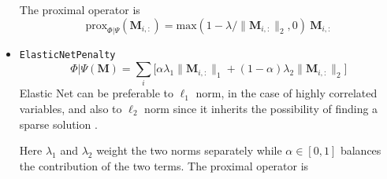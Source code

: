 \begin{itemize}
The proximal operator is
\begin{equation}\label{proxl2}
\text{prox}_{\Phi|\Psi}(\mathbf{M}_{i,:}) = \text{max}(1 - \lambda/ \| \mathbf{M}_{i,:}\|_2, 0)\ \mathbf{M}_{i,:}
\end{equation}
%
%
%
\item \texttt{ElasticNetPenalty}
\begin{equation}\label{l1l2penalty}
\Phi|\Psi(\mathbf{M}) = \sum_{i}\bigg[\alpha \lambda_1 \|\mathbf{M}_{i,:}\|_1 + (1 - \alpha)\lambda_2 \|\mathbf{M}_{i,:}\|_2 \bigg]
\end{equation}
Elastic Net can be preferable to $\ell_1$ norm, in the case of highly correlated variables, and also to $\ell_2$ norm since it inherits the possibility of finding a sparse solution \cite{zou2005regularization}.

Here $\lambda_1$ and $\lambda_2$ weight the two norms separately while $\alpha \in [0,1]$ balances the contribution of the two terms. The proximal operator is


\end{itemize}
